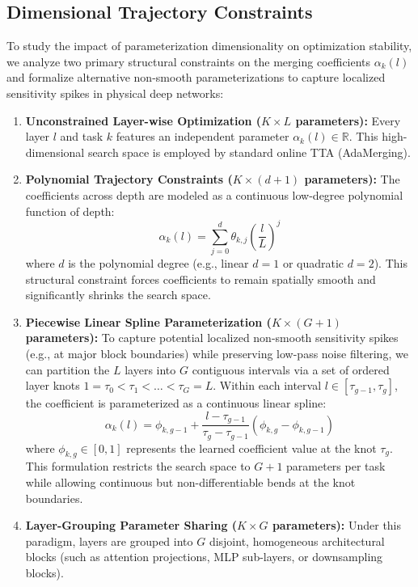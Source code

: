 \subsection{Dimensional Trajectory Constraints}
To study the impact of parameterization dimensionality on optimization stability, we analyze two primary structural constraints on the merging coefficients $\alpha_k(l)$ and formalize alternative non-smooth parameterizations to capture localized sensitivity spikes in physical deep networks:
\begin{enumerate}
    \item \textbf{Unconstrained Layer-wise Optimization ($K \times L$ parameters):} Every layer $l$ and task $k$ features an independent parameter $\alpha_k(l) \in \mathbb{R}$.
This high-dimensional search space is employed by standard online TTA (AdaMerging).
    \item \textbf{Polynomial Trajectory Constraints ($K \times (d+1)$ parameters):} The coefficients across depth are modeled as a continuous low-degree polynomial function of depth:
    \begin{equation}
    \label{eq:polynomial}
    \alpha_k(l) = \sum_{j=0}^d \theta_{k, j} \left( \frac{l}{L} \right)^j
    \end{equation}
    where $d$ is the polynomial degree (e.g., linear $d=1$ or quadratic $d=2$).
This structural constraint forces coefficients to remain spatially smooth and significantly shrinks the search space.
    \item \textbf{Piecewise Linear Spline Parameterization ($K \times (G+1)$ parameters):} To capture potential localized non-smooth sensitivity spikes (e.g., at major block boundaries) while preserving low-pass noise filtering, we can partition the $L$ layers into $G$ contiguous intervals via a set of ordered layer knots $1 = \tau_0 < \tau_1 < \dots < \tau_G = L$.
Within each interval $l \in [\tau_{g-1}, \tau_g]$, the coefficient is parameterized as a continuous linear spline:
    \begin{equation}
    \label{eq:spline}
    \alpha_k(l) = \phi_{k, g-1} + \frac{l - \tau_{g-1}}{\tau_g - \tau_{g-1}} \left( \phi_{k, g} - \phi_{k, g-1} \right)
    \end{equation}
    where $\phi_{k, g} \in [0, 1]$ represents the learned coefficient value at the knot $\tau_g$.
This formulation restricts the search space to $G+1$ parameters per task while allowing continuous but non-differentiable bends at the knot boundaries.
    \item \textbf{Layer-Grouping Parameter Sharing ($K \times G$ parameters):} Under this paradigm, layers are grouped into $G$ disjoint, homogeneous architectural blocks (such as attention projections, MLP sub-layers, or downsampling blocks).

\end{enumerate}
